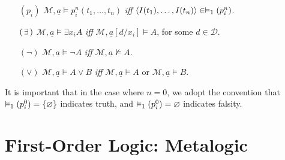 \documentclass[a4paper, 11pt]{article} %
\begin{document}
\begin{enumerate}[leftmargin=1.2in]
\begin{small}
		      \begin{itemize}[leftmargin=.36in]
			      \item[$(p_i)$] $\mathcal{M},\underline{a}\vDash  p_i^n(t_1,\dots,t_n)$ \textit{iff} $\langle I(t_1),\dots,I(t_n)\rangle\in \vDash_1(p_i^n)$.
			      \item[$(\hspace{1.5pt}\exists\hspace{1.5pt})$] $\mathcal{M},\underline{a}\vDash  \exists x_iA$ \textit{iff} $\mathcal{M},\underline{a}[d/x_i]\vDash A$, for some $d\in\mathcal{D}$.
			      \item[$(\neg)$] $\mathcal{M},\underline{a}\vDash  \neg A$ \textit{iff} $\mathcal{M},\underline{a}\nvDash A$.
			      \item[$(\vee)$] $\mathcal{M},\underline{a}\vDash  A\vee B$ \textit{iff} $\mathcal{M},\underline{a}\vDash  A$ or $\mathcal{M},\underline{a}\vDash  B$.
		      \end{itemize}
	      \end{small}
	      It is important that in the case where $n=0$, we adopt the convention that $\vDash_1(p_i^0)=\lbrace\varnothing\rbrace$ indicates truth, and $\vDash_1(p_i^0)=\varnothing$ indicates falsity.
\end{enumerate}



\section*{\sc First-Order Logic: Metalogic}%
\end{document}
